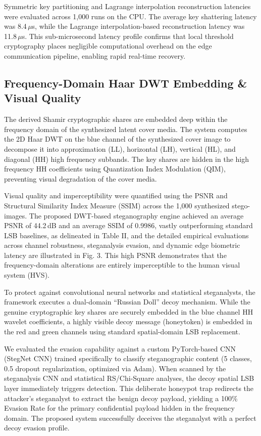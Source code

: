 \documentclass[conference]{IEEEtran}
\begin{document}
Symmetric key partitioning and Lagrange interpolation reconstruction latencies were evaluated across 1,000 runs on the CPU. The average key shattering latency was 8.4\,$\mu$s, while the Lagrange interpolation-based reconstruction latency was 11.8\,$\mu$s. This sub-microsecond latency profile confirms that local threshold cryptography places negligible computational overhead on the edge communication pipeline, enabling rapid real-time recovery.

\subsection{Frequency-Domain Haar DWT Embedding \& Visual Quality}
The derived Shamir cryptographic shares are embedded deep within the frequency domain of the synthesized latent cover media. The system computes the 2D Haar DWT on the blue channel of the synthesized cover image to decompose it into approximation (LL), horizontal (LH), vertical (HL), and diagonal (HH) high frequency subbands. The key shares are hidden in the high frequency HH coefficients using Quantization Index Modulation (QIM), preventing visual degradation of the cover media.

Visual quality and imperceptibility were quantified using the PSNR and Structural Similarity Index Measure (SSIM) across the 1,000 synthesized stego-images. The proposed DWT-based steganography engine achieved an average PSNR of 44.2\,dB and an average SSIM of 0.9986, vastly outperforming standard LSB baselines, as delineated in Table II, and the detailed empirical evaluations across channel robustness, steganalysis evasion, and dynamic edge biometric latency are illustrated in Fig. 3. This high PSNR demonstrates that the frequency-domain alterations are entirely imperceptible to the human visual system (HVS).

To protect against convolutional neural networks and statistical steganalysts, the framework executes a dual-domain ``Russian Doll'' decoy mechanism. While the genuine cryptographic key shares are securely embedded in the blue channel HH wavelet coefficients, a highly visible decoy message (honeytoken) is embedded in the red and green channels using standard spatial-domain LSB replacement.

We evaluated the evasion capability against a custom PyTorch-based CNN (StegNet CNN) trained specifically to classify steganographic content (5 classes, 0.5 dropout regularization, optimized via Adam). When scanned by the steganalysis CNN and statistical RS/Chi-Square analyses, the decoy spatial LSB layer immediately triggers detection. This deliberate honeypot trap redirects the attacker's steganalyst to extract the benign decoy payload, yielding a 100\% Evasion Rate for the primary confidential payload hidden in the frequency domain. The proposed system successfully deceives the steganalyst with a perfect decoy evasion profile.
\end{document}

